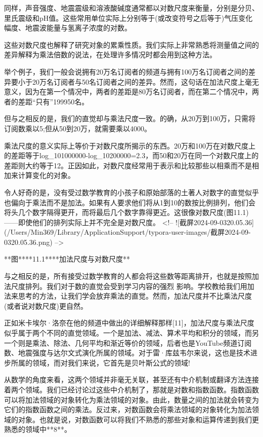 同样，声音强度、地震震级和溶液酸碱度通常都以对数尺度来衡量，分别是分贝、里氏震级和pH值。这些常用单位实际上分别等于(或改变符号之后等于)气压变化幅度、地震波能量与氢离子浓度的对数。

这些对数尺度也解释了研究对象的累乘性质。我们实际上非常熟悉将测量值之间的差异解释为乘法倍数的说法，在处理许多情况时都会用到这种方法。

举个例子，我们一般会说拥有20万名订阅者的频道与拥有100万名订阅者之间的差异要小于20万名订阅者与50名订阅者之间的差异。然而，这句话在加法尺度上毫无意义，因为在第一个情况中，两者的差距是80万名订阅者，而在第二个情况中，两者的差距“只有”199950名。

但与之相反的是，我们的直觉却与乘法尺度一致。的确，从20万到100万，只需将订阅数乘以5;但从50到20万，就需要乘以4000。

乘法尺度的意义实际上等价于对数尺度所揭示的东西。20万和100万在对数尺度上的差距等于log_101000000-log_10200000=2.3，而50和20万在同一个对数尺度上的差距则大约等于12。正因如此，对数尺度经常用于表示和比较那些以相乘而不是相加来计算变化的对象。

令人好奇的是，没有受过数学教育的小孩子和原始部落的土著人对数字的直觉似乎也偏向于乘法而不是加法。如果有人要求他们将从1到10的数按比例排列，他们会将头几个数字隔得更开，而将最后几个数字靠得更近。这很像对数尺度(图11.1)——即使他们的排列实际上并不完全是对数尺度。
<!-- ![截屏2024-09-0320.05.36](/Users/Min369/Library/ApplicationSupport/typora-user-images/截屏2024-09-0320.05.36.png) -->

**图****11.1****加法尺度与对数尺度**



与之相反的是，所有接受过数学教育的人都会将这些数等距离排开，也就是按照加法尺度排列。我们对于数的直觉会受到学习内容的强烈
影响。学校教给我们用加法来思考的方法，让我们学会放弃乘法的直觉。然而，加法尺度并不比乘法尺度(或者说对数尺度)更自然。

正如米卡埃尔·洛奈在他的频道中做出的详细解释那样[11]，加法尺度与乘法尺度似乎属于两个不同的直觉领域。一个是加法、减法、算术平均和积分的领域，而另一个则是乘法、除法、几何平均和渐近等价的领域，后者也是YouTube频道订阅数、地震强度与达尔文式演化所属的领域。对于雷·库兹韦尔来说，这也是技术进步所属的领域，而对我们来说，它首先是贝叶斯公式的领域!

从数学的角度来看，这两个领域并非毫无关联，甚至还有中介机制或翻译方法连接着两个领域。我们已经讨论过这些中介机制了，那就是对数和指数函数。指数函数可以将加法领域的对象转化为乘法领域的对象。由此，数量之间的加法就会转变为它们的指数函数之间的乘法。反过来，对数函数会将乘法领域的对象转化为加法领域的对象。也就是说，对数函数可以将我们不熟悉的那些对象和运算传递到我们更熟悉的领域中**8**。




